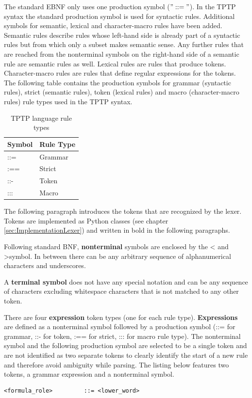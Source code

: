 The standard \ac{EBNF} only uses one production symbol ($"::="$).
In the \ac{TPTP} syntax the standard production symbol is used for syntactic rules.
Additional symbols for semantic, lexical and character-macro rules have been added. Semantic rules describe rules whose left-hand side is already part of a syntactic rules but from which only a subset makes semantic sense. Any further rules that are reached from the nonterminal symbols on the right-hand side of a semantic rule are semantic rules as well. Lexical rules are rules that produce tokens. Character-macro rules are rules that define regular expressions for the tokens.
The following table contains the production symbols for grammar (syntactic rules), strict (semantic rules), token (lexical rules) and macro (character-macro rules) rule types used in the \ac{TPTP} syntax.

\begin{table}[H]
\centering
\caption{\ac{TPTP} language rule types \cite{VS06}}
\begin{tabular}{ll}
\textbf{Symbol} & \textbf{Rule Type}\\\hline
::= & Grammar\\
:== & Strict\\
::- & Token\\
::: & Macro\\
\end{tabular}
\label{tbl:ConceptTPTPProductionSymbols}
\end{table}

The following paragraph introduces the tokens that are recognized by the lexer. Tokens are implemented as Python classes (see chapter \ref{sec:ImplementationLexer}) and written in bold in the following paragraphs.

Following standard \ac{BNF}, \textbf{nonterminal} symbols are enclosed by the \textless\; and \textgreater \;symbol.
In between there can be any arbitrary sequence of alphanumerical characters and underscores.

A \textbf{terminal symbol} does not have any special notation and can be any sequence of characters excluding whitespace characters that is not matched to any other token.

There are four \textbf{expression} token types (one for each rule type).
\textbf{Expressions} are defined as a nonterminal symbol followed by a production symbol (::= for grammar, ::- for token, :== for strict, ::: for macro rule type).
The nonterminal symbol and the following production symbol are selected to be a single token and are not identified as two separate tokens to clearly identify the start of a new rule and therefore avoid ambiguity while parsing.
The listing below features two tokens, a grammar expression and a nonterminal symbol.
\begin{lstlisting}[caption= Rule example]
<formula_role>         ::= <lower_word>
\end{lstlisting}

